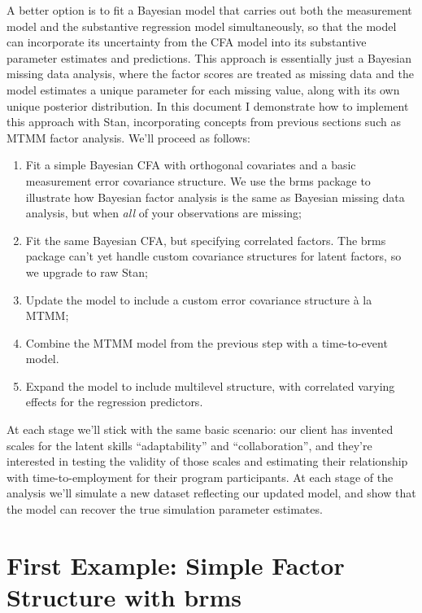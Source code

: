 \documentclass[
  letterpaper,
  DIV=11,
  numbers=noendperiod]{scrreprt}
\providecommand{\tightlist}{%
  \setlength{\itemsep}{0pt}\setlength{\parskip}{0pt}}\usepackage{longtable,booktabs,array}
\begin{document}
A better option is to fit a Bayesian model that carries out both the
measurement model and the substantive regression model simultaneously,
so that the model can incorporate its uncertainty from the CFA model
into its substantive parameter estimates and predictions. This approach
is essentially just a Bayesian missing data analysis, where the factor
scores are treated as missing data and the model estimates a unique
parameter for each missing value, along with its own unique posterior
distribution. In this document I demonstrate how to implement this
approach with Stan, incorporating concepts from previous sections such
as MTMM factor analysis. We'll proceed as follows:

\begin{enumerate}
\def\labelenumi{\arabic{enumi}.}
\tightlist
\item
  Fit a simple Bayesian CFA with orthogonal covariates and a basic
  measurement error covariance structure. We use the brms package to
  illustrate how Bayesian factor analysis is the same as Bayesian
  missing data analysis, but when \emph{all} of your observations are
  missing;
\item
  Fit the same Bayesian CFA, but specifying correlated factors. The brms
  package can't yet handle custom covariance structures for latent
  factors, so we upgrade to raw Stan;
\item
  Update the model to include a custom error covariance structure à la
  MTMM;
\item
  Combine the MTMM model from the previous step with a time-to-event
  model.
\item
  Expand the model to include multilevel structure, with correlated
  varying effects for the regression predictors.
\end{enumerate}

At each stage we'll stick with the same basic scenario: our client has
invented scales for the latent skills ``adaptability'' and
``collaboration'', and they're interested in testing the validity of
those scales and estimating their relationship with time-to-employment
for their program participants. At each stage of the analysis we'll
simulate a new dataset reflecting our updated model, and show that the
model can recover the true simulation parameter estimates.

\hypertarget{first-example-simple-factor-structure-with-brms}{%
\section*{First Example: Simple Factor Structure with
brms}\label{first-example-simple-factor-structure-with-brms}}
\end{document}
